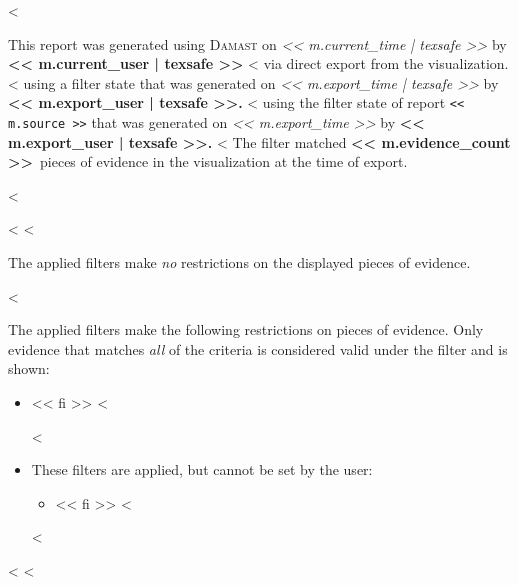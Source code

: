 <%

This report was generated using \textsc{Damast} on
\emph{<< m.current_time | texsafe >>}
by \textbf{<< m.current_user | texsafe >>}
  <%
  via direct export from the visualization.
  <%
  using a filter state that was generated on
  \emph{<< m.export_time | texsafe >>}
  by
  \textbf{<< m.export_user | texsafe >>.}
  <%
  using the filter state of report \texttt{<< m.source >>}
  that was generated on
  \emph{<< m.export_time >>}
  by
  \textbf{<< m.export_user | texsafe >>.}
  <%
  The filter matched
  \textbf{<< m.evidence_count >>}~pieces of evidence
  in the visualization at the time of export.

<%


<%
<%

The applied filters make \emph{no} restrictions on the displayed pieces of evidence.

<%

The applied filters make the following restrictions on pieces of evidence.
Only evidence that matches \emph{all} of the criteria is considered valid under the filter and is shown:

\begin{itemize}
  <%
  \item << fi >>
  <%

  <%
  \item These filters are applied, but cannot be set by the user:
    \begin{itemize}
      <%
      \item << fi >>
      <%
    \end{itemize}
  <%
\end{itemize}
<%
<%

